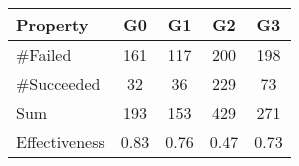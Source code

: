 \begin{tabularx}{.5\linewidth}{X c c c c}
    \toprule
    \bfseries Property & \bfseries G0 & \bfseries G1 & \bfseries G2 & \bfseries G3 \\
    \midrule
    \#Failed      & \num{161}  & \num{117}  & \num{200}  & \num{198}  \\
    \#Succeeded   & \num{32}   & \num{36}   & \num{229}  & \num{73}   \\
    Sum           & \num{193}  & \num{153}  & \num{429}  & \num{271}  \\
    Effectiveness & \num{0.83} & \num{0.76} & \num{0.47} & \num{0.73} \\
    \bottomrule
\end{tabularx}
